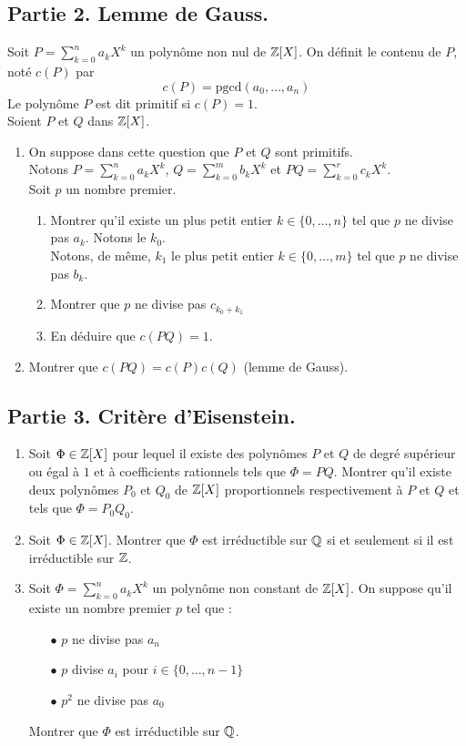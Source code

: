 \subsection*{Partie 2. Lemme de Gauss.}
Soit $P=\sum_{k=0}^na_kX^k$ un polynôme non nul de $\mathbb{Z}[X]$. On définit le contenu de $P$, noté $c(P)$ par $$c(P)=\text{pgcd}(a_0,\dots, a_n)$$
Le polynôme $P$ est dit primitif si $c(P)=1$.\\
Soient $P$ et $Q$ dans $\mathbb{Z}[X]$.
\begin{enumerate}
\item On suppose dans cette question que $P$ et $Q$ sont primitifs.\\
Notons $P=\sum\limits_{k=0}^na_kX^k$, $Q=\sum\limits_{k=0}^mb_kX^k$ et $PQ=\sum\limits_{k=0}^rc_kX^k$. \\
Soit $p$ un nombre premier.
\begin{enumerate} 
\item Montrer qu'il existe un plus petit entier  $k\in\{0,\dots,n\}$ tel que $p$ ne divise pas $a_k$. Notons le $k_0$.\\
Notons, de même, $k_1$ le plus petit entier  $k\in\{0,\dots,m\}$ tel que $p$ ne divise pas $b_k$.
\item Montrer que $p$ ne divise pas $c_{k_0+k_1}$
\item En déduire que $c(PQ)=1$.
\end{enumerate}
\item  Montrer que $c(PQ)=c(P)c(Q)$ (lemme de Gauss).
\end{enumerate} 

\subsection*{Partie 3. Critère d'Eisenstein.}
\begin{enumerate}
\item Soit $\Phi\in\mathbb{Z}[X]$ pour lequel il existe des polynômes $P$ et $Q$ de degré supérieur ou égal à $1$ et à coefficients rationnels tels que $\Phi=PQ$. Montrer qu'il existe deux polynômes $P_0$ et $Q_0$ de $\mathbb{Z}[X]$ proportionnels respectivement à $P$ et $Q$ et tels que $\Phi=P_0Q_0$. 
\item Soit $\Phi\in\mathbb{Z}[X]$. Montrer que $\Phi$ est irréductible sur $\mathbb{Q}$ si et seulement si il est irréductible sur $\mathbb{Z}$.
\item Soit $\Phi=\sum\limits_{k=0}^na_kX^k$ un polynôme non constant de $\mathbb{Z}[X]$. On suppose qu'il existe un nombre premier $p$ tel que   : 
\begin{itemize}
\item[$\bullet$]$p$ ne divise pas $a_n$
\item[$\bullet$]$p$ divise $a_i$ pour $i\in\{0,\dots, n-1\}$
\item[$\bullet$]$p^2$ ne divise pas $a_0$
\end{itemize}
Montrer que $\Phi$ est irréductible sur $\mathbb{Q}$.
\end{enumerate}

